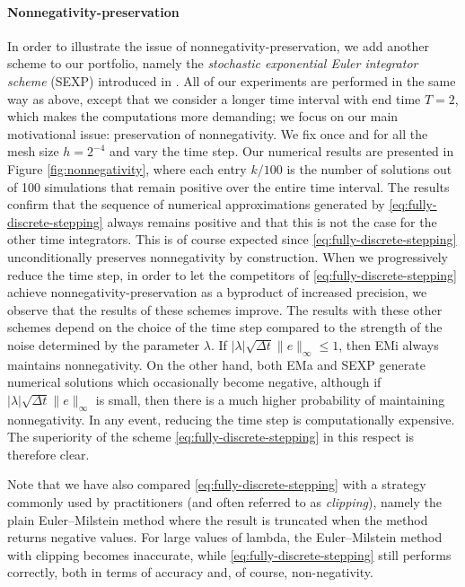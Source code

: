 \documentclass[12pt]{article}
\begin{document}
{\paragraph*{Nonnegativity-preservation}
In order to illustrate the issue of nonnegativity-preservation, we add another scheme to our portfolio, namely the \emph{stochastic exponential Euler integrator scheme} (SEXP) introduced in \cite{lord2013stochastic}. All of our experiments are performed in the same way as above, except that we consider a longer time interval with end time $T=2$, which makes the computations more demanding; we focus on our main motivational issue: preservation of nonnegativity. We fix once and for all the mesh size $h=2^{-4}$ and vary the time step.
Our numerical results are presented in Figure \ref{fig:nonnegativity}, where each entry  $k/100$ 
 is the number of solutions out of 100 simulations that remain positive over the entire time interval. The results confirm that the sequence of numerical approximations generated by \eqref{eq:fully-discrete-stepping} always remains positive and that this is not the case for the other time integrators. This is of course expected since \eqref{eq:fully-discrete-stepping} unconditionally preserves nonnegativity by construction. When we progressively reduce the time step, in order to let the competitors of  \eqref{eq:fully-discrete-stepping} achieve nonnegativity-preservation as a byproduct of increased precision, we observe that the results of these schemes improve. The results with these other schemes depend on the choice of the time step compared to the strength of the noise determined by the parameter $\lambda$.  If $ |\lambda| \sqrt{\Delta t}  \|e\|_{\infty} \leq 1$, then EMi always maintains nonnegativity. On the other hand, both EMa and SEXP generate numerical solutions which occasionally become negative, although if $|\lambda|  \sqrt{\Delta t}  \|e\|_{\infty}$ is small, then there is a much higher probability of maintaining nonnegativity.  In any event, reducing the time step is computationally expensive. The superiority of the scheme  \eqref{eq:fully-discrete-stepping} in this respect is therefore clear.


 Note that we have also compared \eqref{eq:fully-discrete-stepping} with a strategy commonly used by practitioners (and often referred to as \emph{clipping}), namely the plain Euler--Milstein method where the result is truncated when the method returns negative values. 
 For large values of lambda, the Euler--Milstein method with clipping becomes inaccurate, while \eqref{eq:fully-discrete-stepping} still performs correctly, both in terms of accuracy and, of course, non-negativity.
 
}
\end{document}
